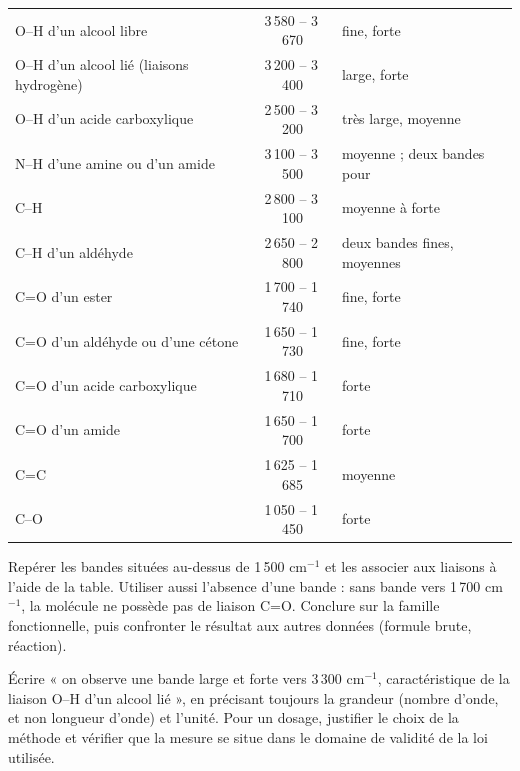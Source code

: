 \begin{center}\small\renewcommand{\arraystretch}{1.2}
\begin{tabularx}{\linewidth}{@{}lcY@{}}\toprule
{} &  & \\\midrule
O--H d'un alcool libre & 3\,580 -- 3\,670 & fine, forte\\
O--H d'un alcool lié (liaisons hydrogène) & 3\,200 -- 3\,400 & large, forte\\
O--H d'un acide carboxylique & 2\,500 -- 3\,200 & très large, moyenne\\
N--H d'une amine ou d'un amide & 3\,100 -- 3\,500 & moyenne ; deux bandes pour \\
C--H & 2\,800 -- 3\,100 & moyenne à forte\\
C--H d'un aldéhyde & 2\,650 -- 2\,800 & deux bandes fines, moyennes\\
C=O d'un ester & 1\,700 -- 1\,740 & fine, forte\\
C=O d'un aldéhyde ou d'une cétone & 1\,650 -- 1\,730 & fine, forte\\
C=O d'un acide carboxylique & 1\,680 -- 1\,710 & forte\\
C=O d'un amide & 1\,650 -- 1\,700 & forte\\
C=C & 1\,625 -- 1\,685 & moyenne\\
C--O & 1\,050 -- 1\,450 & forte\\\bottomrule
\end{tabularx}\end{center}
\begin{savoirfaire}
Repérer les bandes situées au-dessus de 1\,500 cm$^{-1}$ et les associer aux liaisons à l'aide de la table.
Utiliser aussi l'absence d'une bande : sans bande vers 1\,700 cm$^{-1}$, la molécule ne possède pas de liaison C=O.
Conclure sur la famille fonctionnelle, puis confronter le résultat aux autres données (formule brute, réaction).
\end{savoirfaire}
\begin{rediger}
Écrire « on observe une bande large et forte vers 3\,300 cm$^{-1}$, caractéristique de la liaison O--H d'un alcool
lié », en précisant toujours la grandeur (nombre d'onde, et non longueur d'onde) et l'unité. Pour un dosage,
justifier le choix de la méthode et vérifier que la mesure se situe dans le domaine de validité de la loi utilisée.
\end{rediger}
\exercices

